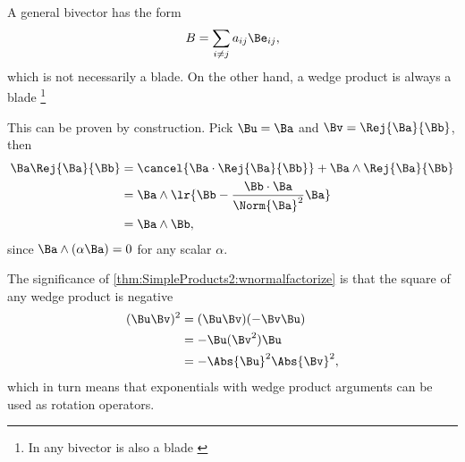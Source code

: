 %
%
A general bivector has the form
\begin{equation}\label{eqn:normalFactorization:1800}
B = \sum_{i \ne j} a_{ij} \Be_{ij},
\end{equation}
which is not necessarily a blade.
On the other hand, a wedge product is always a blade
\footnote{In  any bivector is also a blade \citep{ablamowicz2004lectures:chapter1}}


This can be proven by construction.
Pick \( \Bu = \Ba \) and \( \Bv = \Rej{\Ba}{\Bb} \), then
\begin{equation}\label{eqn:normalFactorization:1840}
\begin{aligned}
\Ba \Rej{\Ba}{\Bb}
&= \cancel{\Ba \cdot \Rej{\Ba}{\Bb}} + \Ba \wedge \Rej{\Ba}{\Bb} \\
&= \Ba \wedge \lr{ \Bb - \frac{\Bb \cdot \Ba}{\Norm{\Ba}^2} \Ba } \\
&= \Ba \wedge \Bb,
\end{aligned}
\end{equation}
since \( \Ba \wedge (\alpha \Ba) = 0 \) for any scalar \( \alpha \).

The significance of \cref{thm:SimpleProducts2:wnormalfactorize} is that the square of any wedge product is negative
\begin{equation}\label{eqn:normalFactorization:1820}
\begin{aligned}
(\Bu \Bv)^2
&= (\Bu \Bv) (-\Bv \Bu) \\
&= -\Bu (\Bv^2) \Bu \\
&= - \Abs{\Bu}^2 \Abs{\Bv}^2,
\end{aligned}
\end{equation}
which in turn means that exponentials with wedge product arguments can be used as rotation operators.


